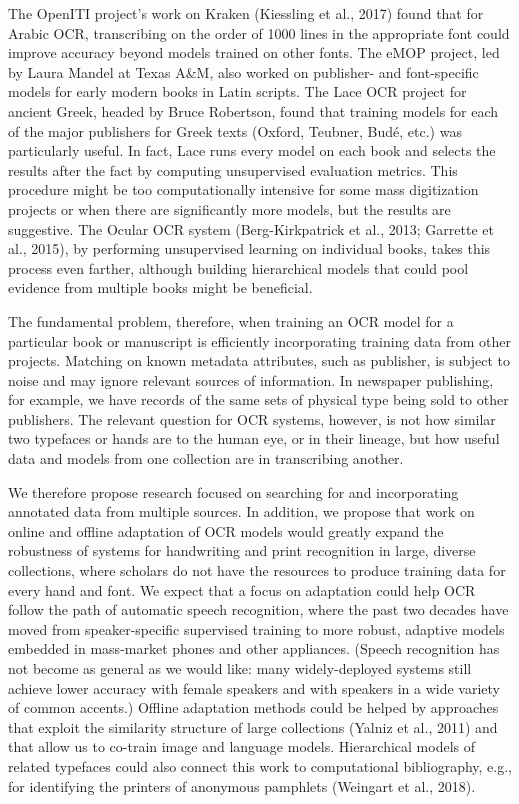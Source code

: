 \documentclass[twoside,11pt]{report}
\begin{document}
The OpenITI project's work on Kraken (Kiessling et al., 2017) found that for Arabic OCR, transcribing on the order of 1000 lines in the appropriate font could improve accuracy beyond models trained on other fonts.  The eMOP project, led by Laura Mandel at Texas A\&M, also worked on publisher- and font-specific models for early modern books in Latin scripts. The Lace OCR project for ancient Greek, headed by Bruce Robertson, found that training models for each of the major publishers for Greek texts (Oxford, Teubner, Budé, etc.) was particularly useful. In fact, Lace runs every model on each book and selects the results after the fact by computing unsupervised evaluation metrics. This procedure might be too computationally intensive for some mass digitization projects or when there are significantly more models, but the results are suggestive. The Ocular OCR system (Berg-Kirkpatrick et al., 2013; Garrette et al., 2015), by performing unsupervised learning on individual books, takes this process even farther, although building hierarchical models that could pool evidence from multiple books might be beneficial.

The fundamental problem, therefore, when training an OCR model for a particular book or manuscript is efficiently incorporating training data from other projects. Matching on known metadata attributes, such as publisher, is subject to noise and may ignore relevant sources of information. In newspaper publishing, for example, we have records of the same sets of physical type being sold to other publishers. The relevant question for OCR systems, however, is not how similar two typefaces or hands are to the human eye, or in their lineage, but how useful data and models from one collection are in transcribing another.

We therefore propose research focused on searching for and incorporating annotated data from multiple sources. In addition, we propose that work on online and offline adaptation of OCR models would greatly expand the robustness of systems for handwriting and print recognition in large, diverse collections, where scholars do not have the resources to produce training data for every hand and font. We expect that a focus on adaptation could help OCR follow the path of automatic speech recognition, where the past two decades have moved from speaker-specific supervised training to more robust, adaptive models embedded in mass-market phones and other appliances. (Speech recognition has not become as general as we would like: many widely-deployed systems still achieve lower accuracy with female speakers and with speakers in a wide variety of common accents.) Offline adaptation methods could be helped by approaches that exploit the similarity structure of large collections (Yalniz et al., 2011) and that allow us to co-train image and language models. Hierarchical models of related typefaces could also connect this work to computational bibliography, e.g., for identifying the printers of anonymous pamphlets (Weingart et al., 2018).
\end{document}
